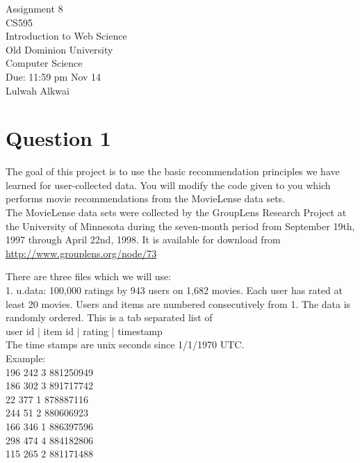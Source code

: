 \documentclass[letterpaper,11pt]{article}
\begin{document}
\begin{titlepage}
\begin{center}
\Huge{Assignment 8}
\\
\Large{CS595}
\\
\Large{Introduction to Web Science}
\\
\Large{Old Dominion University}
\\
\Large{Computer Science}
\\
\Large{Due: 11:59 pm Nov 14}
\\
\Large{Lulwah Alkwai}
\\
\end{center}
\end{titlepage}
\newpage

\section*{Question 1}

The goal of this project is to use the basic recommendation principles
we have learned for user-collected data. You will modify the code
given to you which performs movie recommendations from the MovieLense
data sets.\\

The MovieLense data sets were collected by the GroupLens Research
Project at the University of Minnesota during the seven-month period
from September 19th, 1997 through April 22nd, 1998. It is available
for download from \url{http://www.grouplens.org/node/73}

There are three files which we will use:\\

1.  u.data: 100,000 ratings by 943 users on 1,682 movies. Each
user has rated at least 20 movies. Users and items are numbered
consecutively from 1. The data is randomly ordered. This is a tab
separated list of\\ 

user id | item id | rating | timestamp\\

The time stamps are unix seconds since 1/1/1970 UTC.\\

Example:\\

196	242	3	881250949\\
186	302	3 	891717742\\
22	377	1 	878887116\\
244	51	2 	880606923\\
166	346	1 	886397596\\
298	474	4 	884182806\\
115	265	2	881171488\\
\end{document}
